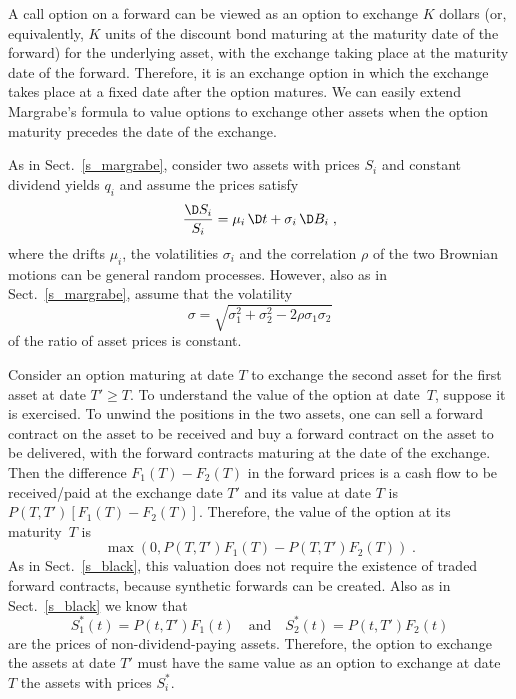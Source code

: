 A call option on a forward can be viewed as an option to exchange $K$ dollars (or, equivalently, $K$ units of the discount bond maturing at the maturity date of the forward) for the underlying asset, with the exchange taking place at the maturity date of the forward.  Therefore, it is an exchange option in which the exchange takes place at a fixed date after the option matures.  We can easily extend Margrabe's formula to value options to exchange other assets when the option maturity precedes the date of the exchange. 

As in Sect.~\ref{s_margrabe}, consider two assets with prices $S_i$ and constant dividend yields $q_i$ and assume the prices satisfy
$$\frac{\D S_i}{S_i} = \mu_i\,\D t + \sigma_i\,\D B_i\; ,$$
where the drifts $\mu_i$, the volatilities $\sigma_i$ and the correlation $\rho$ of the two Brownian motions can be general random processes.  However, also as in Sect.~\ref{s_margrabe}, assume that the volatility
$$\sigma = \sqrt{\sigma_1^2 + \sigma_2^2 - 2\rho\sigma_1\sigma_2}$$
of the ratio of asset prices is constant.  

Consider an option maturing at date $T$ to exchange the second asset for the first asset at date $T'\geq T$.  To understand the value of the option at date~$T$, suppose it is exercised.  To unwind the positions in the two assets, one can sell a forward contract on the asset to be received and buy a forward contract on the asset to be delivered, with the forward contracts maturing at the date of the exchange.  Then the difference $F_1(T)-F_2(T)$ in the forward prices is a cash flow to be received/paid at the exchange date $T'$ and its value at date $T$ is $P(T,T')[F_1(T)-F_2(T)]$.  Therefore, the value of the option at its maturity~$T$ is
$$\max(0,P(T,T')F_1(T) - P(T,T')F_2(T))\; .$$
As in Sect.~\ref{s_black}, this valuation does not require the existence of traded forward contracts, because synthetic forwards can be created.  Also as in Sect.~\ref{s_black} we know that
$$S^*_1(t) = P(t,T')F_1(t) \quad \text{and} \quad S^*_2(t) = P(t,T')F_2(t)$$
are the prices of non-dividend-paying assets.  Therefore, the option to exchange the assets at date $T'$ must have the same value as an option to exchange at date $T$ the assets with prices $S^*_i$.  

